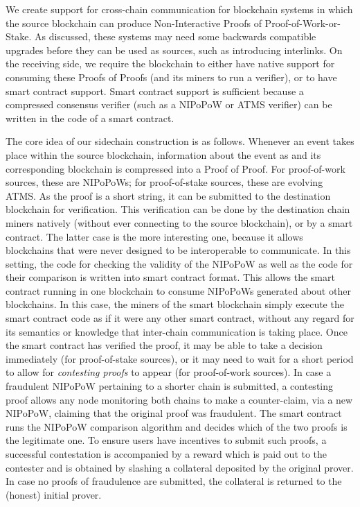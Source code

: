 We create support for cross-chain communication for blockchain systems in which
the source blockchain can produce Non-Interactive Proofs of
Proof-of-Work-or-Stake. As discussed, these systems may need some backwards
compatible upgrades before they can be used as sources, such as introducing
interlinks. On the receiving side, we require the blockchain to either have
native support for consuming these Proofs of Proofs (and its miners to run a
verifier), or to have smart contract support. Smart contract support is
sufficient because a compressed consensus verifier (such as a NIPoPoW or ATMS
verifier) can be written in the code of a smart contract.

The core idea of our sidechain construction is as follows. Whenever an event
takes place within the source blockchain, information about the event as and its
corresponding blockchain is compressed into a Proof of Proof. For proof-of-work
sources, these are NIPoPoWs; for proof-of-stake sources, these are evolving
ATMS. As the proof is a short string, it can be submitted to the destination
blockchain for verification. This verification can be done by the destination
chain miners natively (without ever connecting to the source blockchain), or by
a smart contract. The latter case is the more interesting one, because it allows
blockchains that were never designed to be interoperable to communicate.
In this setting, the code for checking the validity of the NIPoPoW as well
as the code for their comparison is written into smart contract format.
This allows the smart contract running in one blockchain to consume NIPoPoWs
generated about other blockchains. In this case, the miners of the smart
blockchain simply execute the smart contract code as if it were any other smart
contract, without any regard for its
semantics or knowledge that inter-chain communication is taking place.
Once
the smart contract has verified the proof, it may be able to take a decision
immediately (for proof-of-stake sources), or it may need to wait for a short
period to allow for \emph{contesting proofs} to appear (for proof-of-work
sources). In case a fraudulent NIPoPoW pertaining to a shorter chain is
submitted, a contesting proof allows any node monitoring both chains to make
a counter-claim, via a new NIPoPoW, claiming that the original proof was
fraudulent. The smart contract runs the NIPoPoW comparison algorithm and decides
which of the two proofs is the legitimate one. To ensure users have incentives
to submit such proofs, a successful contestation is accompanied by a reward
which is paid out to the contester and is obtained by slashing a collateral
deposited by the original prover. In case no proofs of fraudulence are
submitted, the collateral is returned to the (honest) initial prover.

